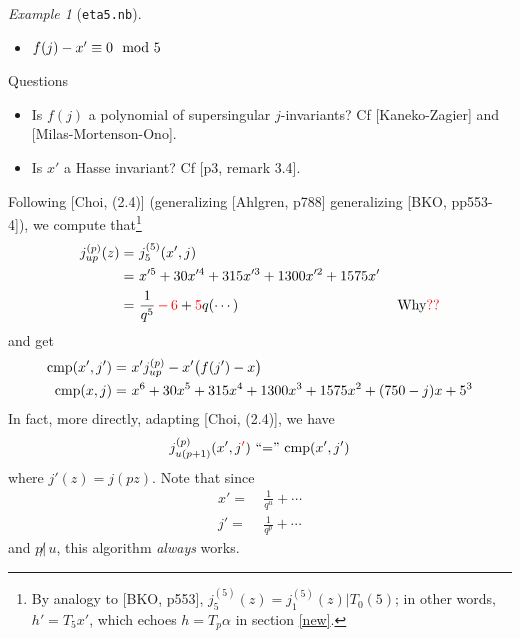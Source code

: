 \documentclass{rs}
\theoremstyle{definition}
\theoremstyle{remark}
\newtheorem{ex}[thm]{Example}
\newcommand{\cmp}{{\rm cmp}}
\newcommand{\md}{~~{\rm mod}~}
\newcommand{\A}{\alpha}
\renewcommand{\=}{\approx}
\renewcommand{\-}{\sim}
\newcommand{\rd}[1]{\textcolor{red}{#1}}
\numberwithin{equation}{section}
\numberwithin{thm}{section}
\begin{document}
\begin{ex}[\texttt{eta5.nb}]
\begin{itemize}
  \item $f(j) - x' \equiv 0 \md 5$ 
 \end{itemize}
 Questions 
 \begin{itemize}
  \item Is $f(j)$ a polynomial of supersingular $j$-invariants?  Cf [Kaneko-Zagier] and [Milas-Mortenson-Ono].  

  \item Is $x'$ a Hasse invariant?  Cf [p3, remark 3.4].  
 \end{itemize}

 Following [Choi, (2.4)] (generalizing [Ahlgren, p788] generalizing [BKO, pp553-4]), we compute that\footnote{By analogy to [BKO, p553], 
 $j_5^{(5)}(z) = j_1^{(5)}(z) | T_0(5)$; in other words, $h' = T_5 x'$, which echoes $h = T_p \A$ in section \ref{new}.  } 
 \begin{equation}
  \label{jup}
  \begin{split}
   j_{u p}^{(p)}(z) = & ~ j_5^{(5)}(x',j) \\
                    = & ~ x'^5 + 30 x'^4 + 315 x'^3 + 1300 x'^2 + 1575 x' \\
                    = & ~ \frac{1}{q^5} \, \rd{- \, 6} + \rd{5} q (\cdots) \hskip 4cm \text{Why\rd{??}} 
  \end{split}
 \end{equation}
 and get 
 \begin{equation*}
  \begin{split}
   \cmp(x',j') = & ~ x' j_{u p}^{(p)} - x' \big(f(j') - x\big) \\
     \cmp(x,j) = & ~ x^6 + 30 x^5 + 315 x^4 + 1300 x^3 + 1575 x^2 + (750 - j) x + 5^3 
  \end{split}
 \end{equation*}
 In fact, more directly, adapting [Choi, (2.4)], we have 
 \[
  j_{u (p + 1)}^{(p)}(x',j\rd{'}) \text{~``$=$''~} \cmp(x',j') 
 \]
 where $j'(z) = j(p z)$.  Note that since 
 \begin{equation*}
  \begin{split}
   x' = & ~ \frac{1}{q^u} + \cdots \\
   j' = & ~ \frac{1}{q^p} + \cdots 
  \end{split}
 \end{equation*}
 and $p \!\!\not|\, u$, this algorithm {\em always} works.  


\end{ex}
\end{document}
